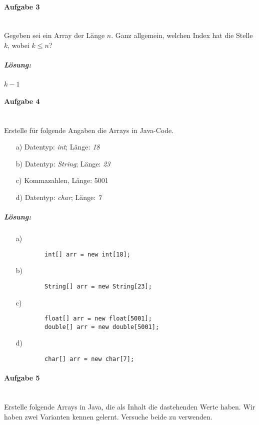 \documentclass[12pt,a4paper,ngerman]{scrartcl}
\begin{document}
	\paragraph{Aufgabe 3}\mbox{}\\
	Gegeben sei ein Array der Länge $n$. Ganz allgemein, welchen Index hat die Stelle $k$, wobei $k \le n$?
	
	\subparagraph{Lösung:}
	$k-1$
	
	\paragraph{Aufgabe 4}\mbox{}\\
	Erstelle für folgende Angaben die Arrays in Java-Code.
	
	\begin{itemize}
		\item[a)] Datentyp: \emph{int}; Länge: \emph{18}
		\item[b)] Datentyp: \emph{String}; Länge: \emph{23}
		\item[c)] Kommazahlen, Länge: 5001
		\item[d)] Datentyp: \emph{char}; Länge: \emph{7}
	\end{itemize}
	
	\subparagraph{Lösung:}
	\begin{itemize}
		\item[a)] \begin{lstlisting}
		int[] arr = new int[18];
		\end{lstlisting}
		
		\item[b)] \begin{lstlisting}
		String[] arr = new String[23];
		\end{lstlisting}
		
		\item[c)] \begin{lstlisting}
		float[] arr = new float[5001];
		double[] arr = new double[5001];
		\end{lstlisting}
		
		\item[d)] \begin{lstlisting}
		char[] arr = new char[7];
		\end{lstlisting}
	\end{itemize}
	
	\paragraph{Aufgabe 5}\mbox{}\\
	Erstelle folgende Arrays in Java, die als Inhalt die dastehenden Werte haben. Wir haben zwei Varianten kennen gelernt. Versuche beide zu verwenden.
	
\end{document}
